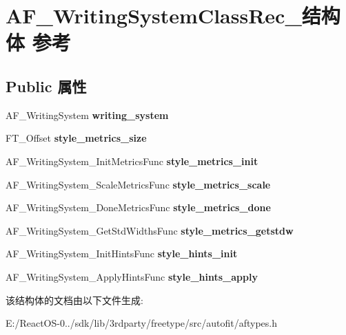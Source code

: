 \hypertarget{struct_a_f___writing_system_class_rec__}{}\section{A\+F\+\_\+\+Writing\+System\+Class\+Rec\+\_\+结构体 参考}
\label{struct_a_f___writing_system_class_rec__}
\subsection*{Public 属性}
\begin{DoxyCompactItemize}
\item 
\mbox{\label{struct_a_f___writing_system_class_rec___a15e39fbe7d4b052906a122361324bdd9}} 
A\+F\+\_\+\+Writing\+System {\bfseries writing\+\_\+system}
\item 
\mbox{\label{struct_a_f___writing_system_class_rec___abcb150bc4dada8564e58402c5a9dd6ba}} 
F\+T\+\_\+\+Offset {\bfseries style\+\_\+metrics\+\_\+size}
\item 
\mbox{\label{struct_a_f___writing_system_class_rec___adfd9745593bf661044c311900d08463a}} 
A\+F\+\_\+\+Writing\+System\+\_\+\+Init\+Metrics\+Func {\bfseries style\+\_\+metrics\+\_\+init}
\item 
\mbox{\label{struct_a_f___writing_system_class_rec___aadb9a27e135b28a146fcb74ca09ec8e2}} 
A\+F\+\_\+\+Writing\+System\+\_\+\+Scale\+Metrics\+Func {\bfseries style\+\_\+metrics\+\_\+scale}
\item 
\mbox{\label{struct_a_f___writing_system_class_rec___a272cf847217c9c045f0e4e1b78e87c50}} 
A\+F\+\_\+\+Writing\+System\+\_\+\+Done\+Metrics\+Func {\bfseries style\+\_\+metrics\+\_\+done}
\item 
\mbox{\label{struct_a_f___writing_system_class_rec___a4dc4a2245660760383721d059bde56f8}} 
A\+F\+\_\+\+Writing\+System\+\_\+\+Get\+Std\+Widths\+Func {\bfseries style\+\_\+metrics\+\_\+getstdw}
\item 
\mbox{\label{struct_a_f___writing_system_class_rec___a153beda7be46f45b02eea05601952e34}} 
A\+F\+\_\+\+Writing\+System\+\_\+\+Init\+Hints\+Func {\bfseries style\+\_\+hints\+\_\+init}
\item 
\mbox{\label{struct_a_f___writing_system_class_rec___ab8863d4ca14172a8b0df5a47d99ab369}} 
A\+F\+\_\+\+Writing\+System\+\_\+\+Apply\+Hints\+Func {\bfseries style\+\_\+hints\+\_\+apply}
\end{DoxyCompactItemize}


该结构体的文档由以下文件生成\+:\begin{DoxyCompactItemize}
\item 
E\+:/\+React\+O\+S-\/0../sdk/lib/3rdparty/freetype/src/autofit/aftypes.\+h\end{DoxyCompactItemize}
